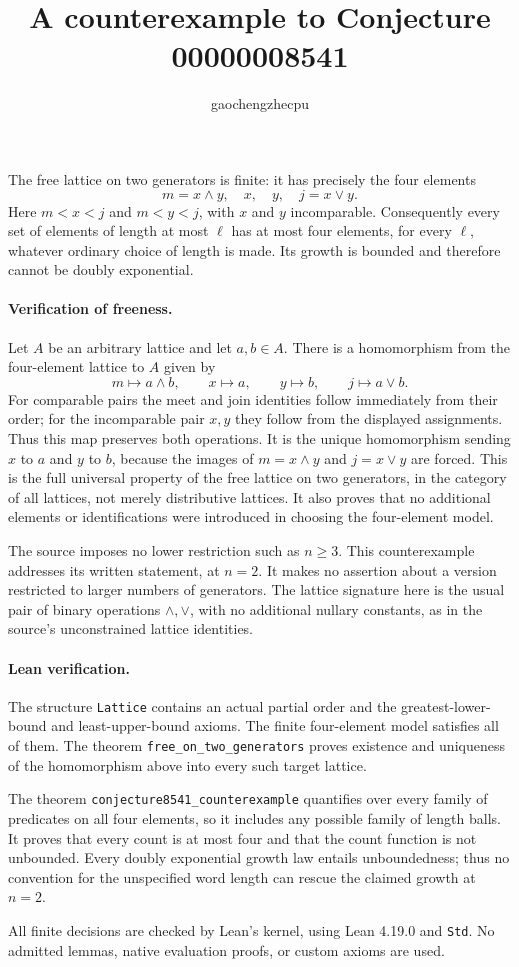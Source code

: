 \documentclass[11pt]{article}
\title{A counterexample to Conjecture 00000008541}
\author{gaochengzhecpu}
\date{}
\begin{document}
\maketitle

The free lattice on two generators is finite: it has precisely the four
elements
\[m=x\wedge y,\quad x,\quad y,\quad j=x\vee y.\]
Here $m<x<j$ and $m<y<j$, with $x$ and $y$ incomparable. Consequently every
set of elements of length at most $\ell$ has at most four elements, for
every $\ell$, whatever ordinary choice of length is made. Its growth is
bounded and therefore cannot be doubly exponential.

\paragraph{Verification of freeness.}
Let $A$ be an arbitrary lattice and let $a,b\in A$. There is a homomorphism
from the four-element lattice to $A$ given by
\[
 m\mapsto a\wedge b,\qquad x\mapsto a,\qquad
 y\mapsto b,\qquad j\mapsto a\vee b.
\]
For comparable pairs the meet and join identities follow immediately from
their order; for the incomparable pair $x,y$ they follow from the displayed
assignments. Thus this map preserves both operations. It is the unique
homomorphism sending $x$ to $a$ and $y$ to $b$, because the images of
$m=x\wedge y$ and $j=x\vee y$ are forced. This is the full universal property
of the free lattice on two generators, in the category of all lattices, not
merely distributive lattices. It also proves that no additional elements
or identifications were introduced in choosing the four-element model.

The source imposes no lower restriction such as $n\ge3$. This counterexample
addresses its written statement, at $n=2$. It makes no assertion about a
version restricted to larger numbers of generators. The lattice signature
here is the usual pair of binary operations $\wedge,\vee$, with no additional
nullary constants, as in the source's unconstrained lattice identities.

\paragraph{Lean verification.}
The structure \texttt{Lattice} contains an actual partial order and the
greatest-lower-bound and least-upper-bound axioms. The finite four-element
model satisfies all of them. The theorem
\texttt{free\_on\_two\_generators} proves existence and uniqueness of the
homomorphism above into every such target lattice.

The theorem \texttt{conjecture8541\_counterexample} quantifies over every
family of predicates on all four elements, so it includes any possible
family of length balls. It proves that every count is at most four and
that the count function is not unbounded. Every doubly exponential growth
law entails unboundedness; thus no convention for the unspecified word
length can rescue the claimed growth at $n=2$.

All finite decisions are checked by Lean's kernel, using Lean 4.19.0 and
\texttt{Std}. No admitted lemmas, native evaluation proofs, or custom axioms
are used.
\end{document}
